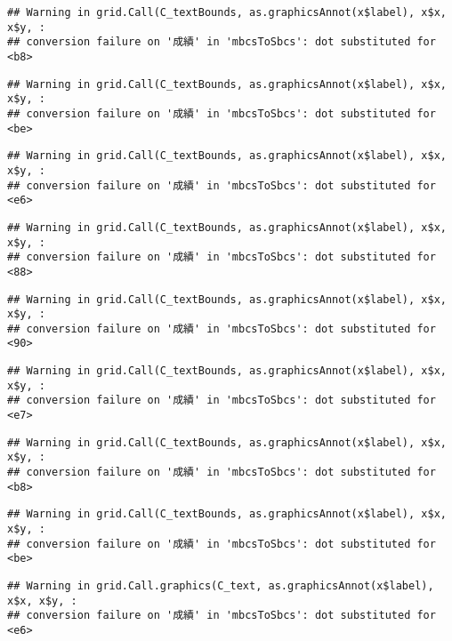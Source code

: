 \documentclass[
]{book}
\begin{document}
\begin{verbatim}
## Warning in grid.Call(C_textBounds, as.graphicsAnnot(x$label), x$x, x$y, :
## conversion failure on '成績' in 'mbcsToSbcs': dot substituted for <b8>
\end{verbatim}

\begin{verbatim}
## Warning in grid.Call(C_textBounds, as.graphicsAnnot(x$label), x$x, x$y, :
## conversion failure on '成績' in 'mbcsToSbcs': dot substituted for <be>
\end{verbatim}

\begin{verbatim}
## Warning in grid.Call(C_textBounds, as.graphicsAnnot(x$label), x$x, x$y, :
## conversion failure on '成績' in 'mbcsToSbcs': dot substituted for <e6>
\end{verbatim}

\begin{verbatim}
## Warning in grid.Call(C_textBounds, as.graphicsAnnot(x$label), x$x, x$y, :
## conversion failure on '成績' in 'mbcsToSbcs': dot substituted for <88>
\end{verbatim}

\begin{verbatim}
## Warning in grid.Call(C_textBounds, as.graphicsAnnot(x$label), x$x, x$y, :
## conversion failure on '成績' in 'mbcsToSbcs': dot substituted for <90>
\end{verbatim}

\begin{verbatim}
## Warning in grid.Call(C_textBounds, as.graphicsAnnot(x$label), x$x, x$y, :
## conversion failure on '成績' in 'mbcsToSbcs': dot substituted for <e7>
\end{verbatim}

\begin{verbatim}
## Warning in grid.Call(C_textBounds, as.graphicsAnnot(x$label), x$x, x$y, :
## conversion failure on '成績' in 'mbcsToSbcs': dot substituted for <b8>
\end{verbatim}

\begin{verbatim}
## Warning in grid.Call(C_textBounds, as.graphicsAnnot(x$label), x$x, x$y, :
## conversion failure on '成績' in 'mbcsToSbcs': dot substituted for <be>
\end{verbatim}

\begin{verbatim}
## Warning in grid.Call.graphics(C_text, as.graphicsAnnot(x$label), x$x, x$y, :
## conversion failure on '成績' in 'mbcsToSbcs': dot substituted for <e6>
\end{verbatim}
\end{document}

